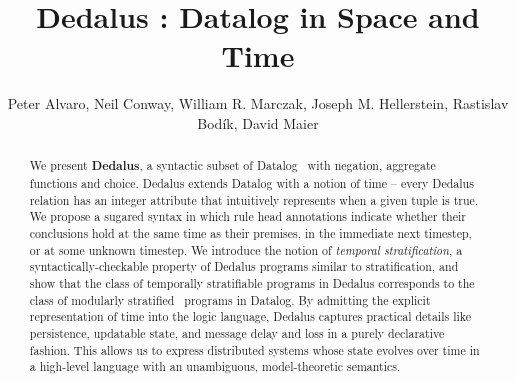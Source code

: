 \documentclass{acm_proc_article-sp-sigmod09}
\begin{document}
\title{Dedalus
: Datalog in Space and Time} 
%


\author{Peter Alvaro, Neil Conway, William R. Marczak, Joseph M. Hellerstein, Rastislav Bod\'{i}k, David Maier}

\maketitle

\begin{abstract}
We present \textbf{Dedalus}, a syntactic subset of Datalog~\cite{ullmanbook} with negation, aggregate functions and choice.  Dedalus extends Datalog with a
notion of time -- every Dedalus relation has an integer attribute that intuitively represents when a given tuple is true.  We propose a sugared syntax in which rule head annotations indicate whether their conclusions hold at the same time as their
premises, in the immediate next timestep, or at some unknown timestep.  
We introduce the notion of \emph{temporal stratification}, a syntactically-checkable property of Dedalus programs
similar to stratification, and show that the class of temporally stratifiable programs in Dedalus corresponds
to the class of modularly stratified~\cite{modular,ross-syntactic} programs in Datalog.  By admitting the explicit representation of time into the logic language,
Dedalus captures practical details like persistence, updatable state, and message delay and loss in a purely declarative fashion.
This allows us to express distributed systems whose state evolves over time in a high-level language with an unambiguous, 
model-theoretic semantics.
\end{abstract}











\end{document}
